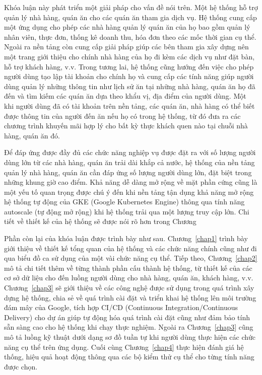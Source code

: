 Khóa luận này phát triển một giải pháp cho vấn đề nói trên.
Một hệ thống hỗ trợ quản lý nhà hàng, quán ăn cho các quán ăn tham gia dịch vụ.
Hệ thống cung cấp một ứng dụng cho phép các nhà hàng quản lý quán ăn của họ bao gồm quản lý nhân viên, thực đơn, thống kê doanh thu, hóa đơn theo các mốc thời gian cụ thể.
Ngoài ra nền tảng còn cung cấp giải pháp giúp các bên tham gia xây dựng nên một trang giới thiệu cho chính nhà hàng của họ đi kèm các dịch vụ như đặt bàn, hỗ trợ khách hàng, v.v.
Trong tương lai, hệ thống cũng hướng đến việc cho phép người dùng tạo lập tài khoản cho chính họ và cung cấp các tính năng giúp người dùng quản lý những thông tin như lịch sử ăn tại những nhà hàng, quán ăn họ đã đến và tìm kiếm các quán ăn dựa theo khẩu vị, địa điểm của người dùng.
Một khi người dùng đã có tài khoản trên nền tảng, các quán ăn, nhà hàng có thể biết được thông tin của người đến ăn nếu họ có trong hệ thống, từ đó đưa ra các chương trình khuyến mãi hợp lý cho bất kỳ thực khách quen nào tại chuỗi nhà hàng, quán ăn đó.

Để đáp ứng được đầy đủ các chức năng nghiệp vụ được đặt ra với số lượng người dùng lớn từ các nhà hàng, quán ăn trải dài khắp cả nước, hệ thống của nền tảng quản lý nhà hàng, quán ăn cần đáp ứng số lượng người dùng lớn, đặt biệt trong những khung giờ cao điểm.
Khả năng dễ dàng mở rộng về mặt phần cứng  cũng là một yếu tố quan trọng được chú ý đến khi nền tảng tận dụng khả năng mở rộng hệ thống tự động của GKE (Google Kubernetes Engine) thông qua tính năng autoscale (tự động mở rộng) khi hệ thống trải qua một lượng truy cập lớn.
Chi tiết về thiết kế của hệ thống sẽ được nói rõ hơn trong Chương~

Phần còn lại của khóa luận được trình bày như sau.
Chương~\ref{chap1} trình bày giới thiệu về thiết kế tổng quan của hệ thống và các chức năng chính cũng như đi qua biểu đồ ca sử dụng của một vài chức năng cụ thể.
Tiếp theo, Chương~\ref{chap2} mô tả chi tiết thêm về từng thành phần cấu thành hệ thống, từ thiết kế của các cơ sở dữ liệu cho đến luồng người dùng cho nhà hàng, quán ăn, khách hàng, v.v.
Chương~\ref{chap3} sẽ giới thiệu về các công nghệ được sử dụng trong quá trình xây dựng hệ thống, chia sẻ về quá trình cài đặt và triển khai hệ thống lên môi trường đám mây của Google, tích hợp CI/CD (Continuous Integration/Continuous Delivery) cho dự án giúp tự động hóa quá trình cài đặt cũng như đảm bảo tính sẵn sàng cao cho hệ thống khi chạy thực nghiệm.
Ngoài ra Chương~\ref{chap3} cũng mô tả luồng kỹ thuật dưới dạng sơ đồ tuần tự khi người dùng thực hiện các chức năng cụ thể trên ứng dụng.
Cuối cùng Chương~\ref{chap4} thực hiện đánh giá hệ thống, hiệu quả hoạt động thông qua các bộ kiểm thử cụ thể cho từng tính năng được chọn.